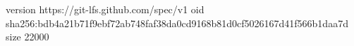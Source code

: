 version https://git-lfs.github.com/spec/v1
oid sha256:bdb4a21b71f9ebf72ab748faf38da0cd9168b81d0cf5026167d41f566b1daa7d
size 22000
